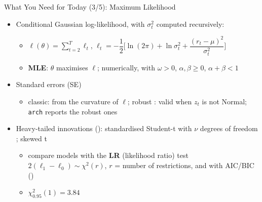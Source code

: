 \begin{frame}{What You Need for Today (3/5): Maximum Likelihood}
\itemsize{\small}
\begin{itemize}
    \item Conditional Gaussian log-likelihood, with $\sigma_t^2$ computed recursively:
    \begin{itemize}
        \item $\ell(\theta) = \sum_{t=2}^{T}\ell_t$, \quad $\ell_t = -\dfrac12\Big[\ln(2\pi) + \ln\sigma_t^2 + \dfrac{(r_t - \mu)^2}{\sigma_t^2}\Big]$
        \item \textbf{MLE}: $\hat\theta$ maximises $\ell$; numerically, with $\omega > 0$, $\alpha, \beta \ge 0$, $\alpha + \beta < 1$
    \end{itemize}
    \item Standard errors (SE)
    \begin{itemize}
        \item classic: from the curvature of $\ell$; robust : valid when $z_t$ is not Normal; \texttt{arch} reports the robust ones
    \end{itemize}
    \item Heavy-tailed innovations (): standardised Student-t with $\nu$ degrees of freedom ; skewed t 
    \begin{itemize}
        \item compare models with the \textbf{LR} (likelihood ratio) test $2(\ell_1 - \ell_0) \sim \chi^2(r)$, $r$ = number of restrictions, and with AIC/BIC ()
        \item $\chi^2_{0.95}(1) = 3.84$
    \end{itemize}
\end{itemize}
\end{frame}


